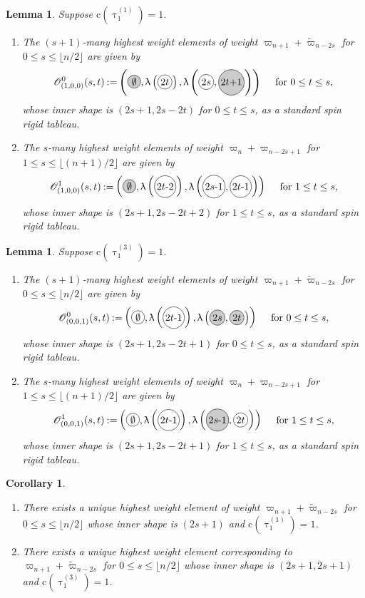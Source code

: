 \documentclass[11pt, leqno]{amsart}
\theoremstyle{plain}
\newtheorem{lemma}[theorem]{Lemma}
\newtheorem{corollary}[theorem]{Corollary}
\theoremstyle{definition}
\numberwithin{equation}{section}
\newcommand{\fw}{\varpi} %
\newcommand{\tfw}{\widetilde{\fw}} %
\newcommand{\seteq}{\mathbin{:=}}
\newcommand{\ntau}[1]{\btau^{(#1)}}
\newcommand{\clr}{\mathrm{c}}
\newcommand{\btau}{\uptau}
\newcommand*\gn[1]{\tikz[baseline=(char.base)]{%
            \node[shape=circle,fill=gray!40,draw,inner sep=1.3pt] (char) {#1};}}
\newcommand*\nn[1]{\tikz[baseline=(char.base)]{%
            \node[shape=circle,draw,inner sep=1.3pt] (char) {#1};}}
\begin{document}
\begin{lemma}
\label{lem: hw 3 odd 100}
Suppose $\clr(\ntau{1}_1)=1$.
\begin{enumerate}
\item[{\rm (1)}] The $(s+1)$-many highest weight elements of weight $\fw_{n+1}+\tfw_{n-2s}$ for $0 \le s \le \lfloor n/2\rfloor$ are given by
\[
\mathscr{O}^0_{(1,0,0)}(s,t) \seteq \left(\gn{$\emptyset$},  \uplambda\left(\nn{$2t$}\right), \uplambda\left(\nn{$2s$},\gn{$2t$+$1$}\right) \right) \quad \text{ for } 0 \le t \le s,
\]
whose inner shape is $(2s+1,2s-2t)$ for $0 \le t \le s$, as a standard spin rigid tableau.
\item[{\rm (2)}] The $s$-many highest weight elements of weight $\fw_{n}+\fw_{n-2s+1}$ for $1 \le s \le \lfloor (n+1)/2\rfloor$ are given by
\[
\mathscr{O}^1_{(1,0,0)}(s,t) \seteq \left(\gn{$\emptyset$},  \uplambda\left(\nn{$2t$-$2$}\right), \uplambda\left(\nn{$2s$-$1$},\nn{$2t$-$1$}\right) \right) \quad \text{ for } 1 \le t \le s,
\]
whose inner shape is $(2s+1,2s-2t+2)$ for $1 \le t \le s$, as a standard spin rigid tableau.
\end{enumerate}
\end{lemma}

\begin{lemma}
\label{lem: hw 3 odd 001}
Suppose $\clr(\ntau{3}_1)=1$.
\begin{enumerate}
\item[{\rm (1)}] The $(s+1)$-many highest weight elements of weight $\fw_{n+1}+\tfw_{n-2s}$ for $0 \le s \le \lfloor n/2\rfloor$ are given by
\[
\mathscr{O}^0_{(0,0,1)}(s,t) \seteq \left(\nn{$\emptyset$},  \uplambda\left(\nn{$2t$-$1$}\right), \uplambda\left(\gn{$2s$},\gn{$2t$}\right) \right) \quad \text{ for } 0 \le t \le s,
\]
whose inner shape is $(2s+1,2s-2t+1)$ for $0 \le t \le s$, as a standard spin rigid tableau.
\item[{\rm (2)}] The $s$-many highest weight elements of weight $\fw_{n}+\fw_{n-2s+1}$ for $1 \le s \le \lfloor (n+1)/2\rfloor$ are given by
\[
\mathscr{O}^1_{(0,0,1)}(s,t) \seteq \left(\nn{$\emptyset$},  \uplambda\left(\nn{$2t$-$1$}\right), \uplambda\left(\gn{$2s$-$1$},\nn{$2t$}\right) \right) \quad \text{ for } 1 \le t \le s,
\]
whose inner shape is $(2s+1,2s-2t+1)$ for $1 \le t \le s$, as a standard spin rigid tableau.
\end{enumerate}
\end{lemma}


\begin{corollary}
\label{cor: unique odd}
\hfill
\begin{enumerate}
\item[{\rm (1)}] There exists a unique highest weight element of weight $\fw_{n+1}+\tfw_{n-2s}$ for $0 \le s \le \lfloor n/2\rfloor$ whose inner shape is $(2s+1)$ and $\clr(\ntau{1}_1)=1$.
\item[{\rm (2)}] There exists a unique highest weight element corresponding to $\fw_{n+1}+\tfw_{n-2s}$ for $0 \le s \le \lfloor n/2\rfloor$ whose inner shape is $(2s+1,2s+1)$ and $\clr(\ntau{3}_1)=1$.
\end{enumerate}
\end{corollary}
\end{document}
